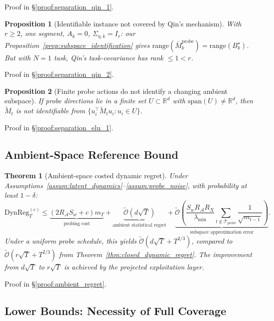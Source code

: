 \documentclass{article}
\newcommand{\R}{\mathbb{R}}
\newcommand{\cA}{\mathcal{A}}
\newcommand{\cTprobe}{\mathcal{T}_{\mathrm{probe}}}
\newcommand{\tilO}{\widetilde{\mathcal{O}}}
\newcommand{\DynReg}{\mathrm{DynReg}}
\newcommand{\range}{\mathrm{range}}
\newcommand{\Span}{\mathrm{span}}
\newtheorem{theorem}{Theorem}
\newtheorem{proposition}{Proposition}
\begin{document}
Proof in \S\ref{proof:separation_qin_1}.

\begin{proposition}[Identifiable instance not covered by Qin's mechanism]
\label{prop:separation_qin_2}
With $r\ge 2$, one segment, $A_k = 0$, $\Sigma_{\eta,k} = I_r$: our Proposition~\ref{prop:subspace_identification} gives $\range(\bar M_k^{\mathrm{probe}})=\range(B_k^\star)$.
But with $N=1$ task, Qin's task-covariance has rank $\le 1 < r$.
\end{proposition}

Proof in \S\ref{proof:separation_qin_2}.

\begin{proposition}[Finite probe actions do not identify a changing ambient subspace]
\label{prop:separation_elu_1}
If probe directions lie in a finite set $U \subset \R^d$ with $\Span(U) \neq \R^d$, then $\widetilde M_t$ is not identifiable from $\{u_i^\top \widetilde M_t u_i : u_i \in U\}$.
\end{proposition}

Proof in \S\ref{proof:separation_elu_1}.

\subsection{Ambient-Space Reference Bound}
\label{app:ambient_reference}

\begin{theorem}[Ambient-space costed dynamic regret]
\label{thm:ambient_regret}
Under Assumptions~\ref{assum:latent_dynamics}--\ref{assum:probe_noise}, with probability at least $1-\delta$:
\[
    \DynReg_T^{(c)} \le \underbrace{(2 R_{\cA} S_w + c) m_T}_{\text{probing cost}}
    + \underbrace{\tilO(d \sqrt{T})}_{\text{ambient statistical regret}}
    + \underbrace{\tilO\!\left( \frac{S_w R_{\cA} R_X}{\lambda_{\min}} \sum_{t \notin \cTprobe} \frac{1}{\sqrt{m_{t-1}}} \right)}_{\text{subspace approximation error}}.
\]
Under a uniform probe schedule, this yields $\tilO(d\sqrt{T} + T^{2/3})$, compared to $\tilO(r\sqrt{T} + T^{2/3})$ from Theorem~\ref{thm:closed_dynamic_regret}.
The improvement from $d\sqrt{T}$ to $r\sqrt{T}$ is achieved by the projected exploitation layer.
\end{theorem}

Proof in \S\ref{proof:ambient_regret}.

\subsection{Lower Bounds: Necessity of Full Coverage}
\label{app:coverage_lower_bound}
\label{app:coverage_lower_bound_statements}
\end{document}
